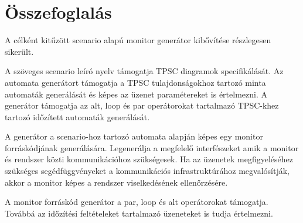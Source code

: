 \chapter{Összefoglalás}

A célként kitűzött scenario alapú monitor generátor kibővítése részlegesen sikerült.

A szöveges scenario leíró nyelv támogatja TPSC diagramok specifikálását. Az automata generátort támogatja a TPSC tulajdonságokhoz tartozó minta automaták generálását és képes az üzenet paramétereket is értelmezni. A generátor támogatja az alt, loop és par operátorokat tartalmazó TPSC-khez tartozó időzített automaták generálását.

A generátor a scenario-hoz tartozó automata alapján képes egy monitor forráskódjának generálására. Legenerálja a megfelelő interfészeket amik a monitor és rendszer közti kommunikációhoz szükségesek. Ha az üzenetek megfigyeléséhez szükséges segédfüggvényeket a kommunikációs infrastruktúrához megvalósítják, akkor a monitor képes a rendszer viselkedésének ellenőrzésére.

A monitor forráskód generátor a par, loop és alt operátorokat támogatja. Továbbá az időzítési feltételeket tartalmazó üzeneteket is tudja értelmezni.